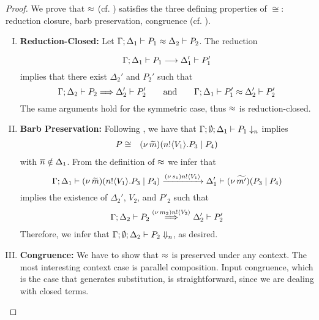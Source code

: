 \begin{proof}
	\noi We prove that $\approx$ (cf. ) satisfies the three defining properties of $\cong$:
	reduction closure, barb preservation, congruence (cf. ).
%
\begin{enumerate}[I.]

\item	{\bf Reduction-Closed:}
	Let
		$\Gamma; \Delta_1 \vdash P_1 \approx \Delta_2 \vdash P_2$. The reduction

	\[
		\Gamma; \Delta_1 \vdash P_1 \longrightarrow \Delta_1' \vdash P_1'
	\]
%
	\noi implies that there exist $\Delta_2'$ and $P_2'$ such that 
  \[
		\Gamma; \Delta_2 \vdash P_2 \stackrel{}{\Longrightarrow} \Delta_2' \vdash P_2'
		\qquad \text{and} \qquad
		\Gamma; \Delta_1 \vdash P_1' \approx \Delta_2' \vdash P_2'
		\]
 The same arguments hold for the symmetric case, thus $\approx$ is reduction-closed.

	\item {\bf Barb Preservation:} Following , we have that
$		\Gamma; \emptyset; \Delta_1 \vdash P_1 \downarrow_{n}$
	implies 
	\begin{eqnarray*}
		P &\cong& (\nu\, \widetilde{m})(n ! \langle V_1 \rangle . P_3 \;|\; P_4)
	\end{eqnarray*}
with $\overline{n} \notin \Delta_1$.
	\noi From the definition of $\approx$ we infer that
%
\[
	\Gamma; \Delta_1 \vdash (\nu\, \widetilde{m})(n ! \langle V_1 \rangle . P_3 \;|\; P_4) \xrightarrow{(\nu\, s_1) n ! \langle V_1 \rangle} \Delta_1' \vdash (\nu\, \widetilde{m'})(P_3 \;|\; P_4)
\]
	\noi implies the existence of $\Delta_2'$, $V_2$, and $P'_2$ such that
%
	\begin{eqnarray*}
		\Gamma; \Delta_2 \vdash P_2 \stackrel{(\nu\, m_2) n ! \langle V_2 \rangle}{\Longrightarrow} \Delta_2' \vdash P_2'
	\end{eqnarray*}
   Therefore, we infer that 
$		\Gamma; \emptyset; \Delta_2 \vdash P_2 \Downarrow_{n}$, as desired.

	\item {\bf Congruence:}
	We have to show that  $\approx$
	is preserved under any context.
	The most interesting context case is parallel composition.
	Input congruence, which is the case that generates substitution,
	is straightforward, since we are dealing with closed terms.


\end{enumerate}
\end{proof}
